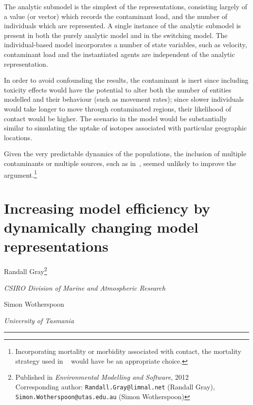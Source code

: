 The analytic submodel is the simplest of the representations,
consisting largely of a value (or vector) which records the
contaminant load, and the number of individuals which are represented.
A single instance of the analytic submodel is present in both the 
purely analytic model and in the switching model.  The individual-based
model incorporates a number of state variables, such as velocity,
contaminant load and the instantiated agents are independent of the
analytic representation.

In order to avoid confounding the results, the contaminant is inert
since including toxicity effects would have the potential to alter
both the number of entities modelled and their behaviour (such as
movement rates); since slower individuals would take longer to move
through contaminated regions, their likelihood of contact would be
higher.  The scenario in the model would be substantially similar to
simulating the uptake of isotopes associated with particular geographic
locations.

Given the very predictable dynamics of the populations, the inclusion
of multiple contaminants or multiple sources, such as
in~\cite{gray2006nws, gray2014}, seemed unlikely to improve the
argument.\footnote{Incorporating mortality or morbidity associated with
  contact, the mortality strategy used in ~\citet{grayningaloo} would
  have be an appropriate choice.}

\pagebreak

\section*{Increasing model efficiency by dynamically changing model representations}
\begin{center}
    Randall Gray\footnote{
     {Published in \emph{Environmental Modelling and Software\/}, 2012}\\
       Corresponding author:
      \texttt{Randall.Gray@limnal.net} (Randall Gray),\\
      \texttt{Simon.Wotherspoon@utas.edu.au} (Simon Wotherspoon)
    }

    \emph{CSIRO Division of Marine and Atmospheric Research\/}

    Simon Wotherspoon 

    \emph{University of Tasmania\/}
\end{center}

\rule{\textwidth}{2pt}

